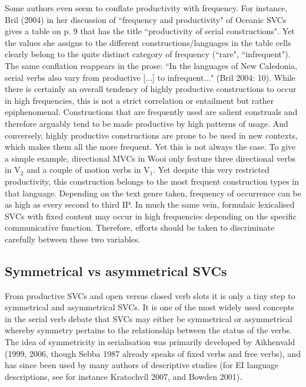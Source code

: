 Some authors even seem to conflate productivity with frequency. For instance, Bril (2004) in her discussion of ``frequency and productivity" of Oceanic SVCs gives a table on p. 9 that has the title ``productivity of serial constructions". Yet the values she assigns to the different constructions/languages in the table cells clearly belong to the quite distinct category of frequency (``rare", ``infrequent"). The same conflation reappears in the prose: ``In the languages of New Caledonia, serial verbs also vary from productive [...] to infrequent..." (Bril 2004: 10). While there is certainly an overall tendency of highly productive constructions to occur in high frequencies, this is not a strict correlation or entailment but rather epiphenomenal. Constructions that are frequently used are salient construals and therefore arguably tend to be made productive by high patterns of usage. And conversely, highly productive constructions are prone to be used in new contexts, which makes them all the more frequent. Yet this is not always the case. To give a simple example, directional MVCs in Wooi only feature three directional verbs in V$_2$ and a couple of motion verbs in V$_1$. Yet despite this very restricted productivity, this construction belongs to the most frequent construction types in that language. Depending on the text genre taken, frequency of occurrence can be as high as every second to third IP. In much the same vein, formulaic lexicalised SVCs with fixed content may occur in high frequencies depending on the specific communicative function. Therefore, efforts should be taken to discriminate carefully between these two variables.

\subsection{Symmetrical vs asymmetrical SVCs}

From productive SVCs and open versus closed verb slots it is only a tiny step to symmetrical and asymmetrical SVCs. It is one of the most widely used concepts in the serial verb debate that SVCs may either be symmetrical or asymmetrical whereby symmetry pertains to the relationship between the status of the verbs. The idea of symmetricity in serialisation was primarily developed by Aikhenvald (1999, 2006, though Sebba 1987 already speaks of fixed verbs and free verbs), and has since been used by many authors of descriptive studies (for EI language descriptions, see for instance Kratochvíl 2007, and Bowden 2001).

